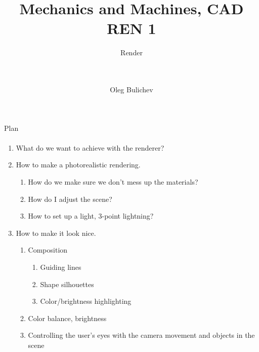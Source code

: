 \documentclass[aspectratio=169]{beamer}
\title[MaM]{Mechanics and Machines, CAD REN 1} %
\subtitle{Render  
\\ \  
\\ \ 
    } %
\author{Oleg Bulichev}
\newcommand{\fbckg}[1]{\usebackgroundtemplate{\texttt{[image: \#1]}}}%
\begin{document}
\setlength{\abovedisplayskip}{0pt}
\setlength{\belowdisplayskip}{0pt}
\setlength{\abovedisplayshortskip}{0pt}
\setlength{\belowdisplayshortskip}{0pt}

\fbckg{fibeamer/figs/title_page.png}

\fbckg{fibeamer/figs/common.png}

\note{\scriptsize
}

\begin{frame}[t]{Plan}
\framesubtitle{}
\begin{enumerate}
    \item What do we want to achieve with the renderer?
    \item How to make a photorealistic rendering.
    \begin{enumerate}
        \item How do we make sure we don't mess up the materials?
        \item How do I adjust the scene?
        \item How to set up a light, 3-point lightning?
    \end{enumerate}
    \item How to make it look nice. 
    \begin{enumerate}
        \item Composition
        \begin{enumerate}
            \item Guiding lines
            \item Shape silhouettes
            \item Color/brightness highlighting
        \end{enumerate}
        \item Color balance, brightness
        \item Controlling the user's eyes with the camera movement and objects in the scene
    \end{enumerate}
\end{enumerate}
\end{frame}
\end{document}
